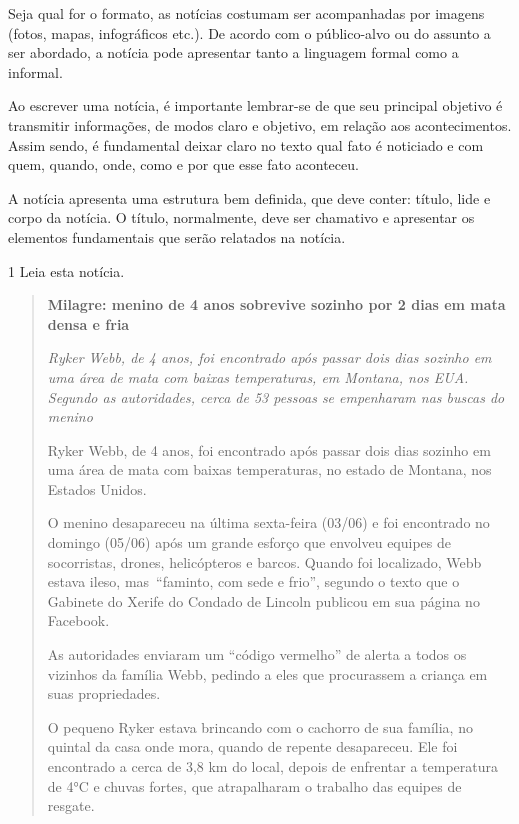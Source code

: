 \begin{escolha}
\begin{escolha}
{{Seja qual for o formato, as notícias costumam ser acompanhadas por
imagens (fotos, mapas, infográficos etc.). De acordo com o público-alvo
ou do assunto a ser abordado, a notícia pode apresentar tanto a
linguagem formal como a informal.

Ao escrever uma notícia, é importante lembrar-se de que seu principal
objetivo é transmitir informações, de modos claro e objetivo, em relação
aos acontecimentos. Assim sendo, é fundamental deixar claro no texto
qual fato é noticiado e com quem, quando, onde, como e por que esse fato
aconteceu.

A notícia apresenta uma estrutura bem definida, que deve conter: título,
lide e corpo da notícia. O título, normalmente, deve ser chamativo e
apresentar os elementos fundamentais que serão relatados na notícia.
}


\num{1} Leia esta notícia.



\begin{quote}
\textbf{Milagre: menino de 4 anos sobrevive sozinho por 2 dias em mata densa e fria}

\emph{Ryker Webb, de 4 anos, foi encontrado após passar dois dias
sozinho em uma área de mata com baixas temperaturas, em Montana, nos
EUA. Segundo as autoridades, cerca de 53 pessoas se empenharam nas
buscas do menino}

Ryker Webb, de 4 anos, foi encontrado após passar dois dias sozinho em
uma área de mata com baixas temperaturas, no estado de Montana, nos
Estados Unidos.

O menino desapareceu na última sexta-feira (03/06) e foi encontrado no
domingo (05/06) após um grande esforço que envolveu equipes de
socorristas, drones, helicópteros e barcos. Quando foi localizado, Webb
estava ileso, mas~``faminto, com sede e frio'', segundo o texto que o
Gabinete do Xerife do Condado de Lincoln publicou em sua página no
Facebook.

As autoridades enviaram um ``código vermelho'' de alerta a todos os
vizinhos da família Webb, pedindo a eles que procurassem a criança em
suas propriedades.

O pequeno Ryker estava brincando com o cachorro de sua família, no
quintal da casa onde mora, quando de repente desapareceu. Ele foi
encontrado a cerca de 3,8 km do local, depois de enfrentar a temperatura
de 4°C e chuvas fortes, que atrapalharam o trabalho das equipes de
resgate.


\end{quote}}
\end{escolha}
\end{escolha}
